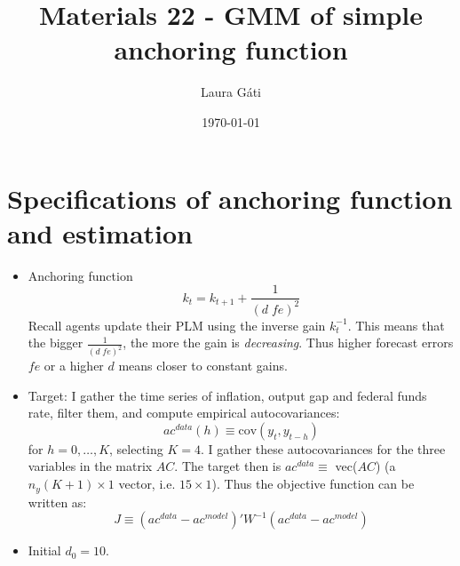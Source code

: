 \documentclass[11pt]{article}
\renewcommand{\[}{\begin{equation}}
\renewcommand{\]}{\end{equation}}
\begin{document}
\linespread{1.0}

\title{Materials 22 - GMM of simple anchoring function}
\author{Laura G\'ati} 
\date{\today}
\maketitle


\tableofcontents


\section{Specifications of anchoring function and estimation}

\begin{itemize}
\item Anchoring function
\begin{equation}
k_t = k_{t+1} + \frac{1}{(d \; fe)^2}
\end{equation}
Recall agents update their PLM using the inverse gain $k_t^{-1}$. This means that the bigger $ \frac{1}{(d \; fe)^2}$,  the more the gain is \emph{decreasing}. Thus higher forecast errors $fe$ or a higher $d$ means closer to constant gains.

\item Target: I gather the time series of inflation, output gap and federal funds rate, filter them, and compute empirical autocovariances:
\begin{equation}
ac^{data}(h) \equiv \text{cov}(y_t, y_{t-h})
\end{equation}
for $h=0,\dots,K$, selecting $K=4$. I gather these autocovariances for the three variables in the matrix $AC$. The target then is $ac^{data} \equiv$ vec($AC$) (a $n_y  (K+1) \times 1$ vector, i.e. $15\times 1$). Thus the objective function can be written as:
\begin{equation}
J \equiv (ac^{data}-ac^{model})' W^{-1} (ac^{data}-ac^{model})
\end{equation}

\item Initial $d_0 = 10$.
\end{itemize}
\end{document}
